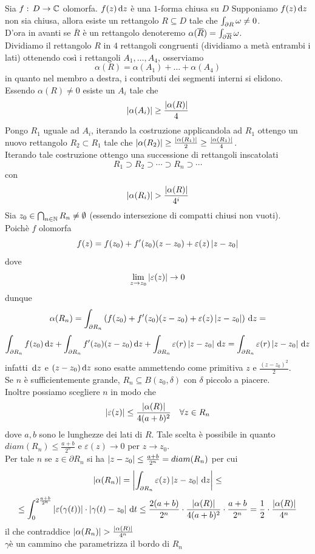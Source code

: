 \newpage
\begin{thm}Sia $f:\, D \to \mathbb{C}$ olomorfa. $f(z)\, \mathrm{d} z $ \`e una $1$-forma chiusa su $D$ 
\proof Supponiamo $f(z) \, \mathrm{d} z $ non sia chiusa, allora esiste un rettangolo $R\subseteq D$ tale che $\int_{\partial R} \omega \neq 0$.\\
D'ora in avanti se $\overline{R}$ \`e un rettangolo denoteremo $\alpha(\overline{R})=\int_{\partial \overline{R}} \omega$.\\
Dividiamo il rettangolo $R$ in $4$ rettangoli congruenti (dividiamo a met\`a entrambi i lati) ottenendo cos\`i i rettangoli $A_1, \dots, A_4$, osserviamo 
$$ \alpha(R) =\alpha(A_1) +\dots + \alpha(A_4)$$
in quanto nel membro a destra, i contributi dei segmenti interni si elidono.\\
Essendo $\alpha(R)\neq 0$ esiste un $A_i$ tale che 
$$ \left\vert \alpha(A_i) \right\vert\geq \frac{\left\vert \alpha(R) \right\vert}{4}$$ 
Pongo $R_1$ uguale ad $A_i$, iterando la costruzione applicandola ad $R_1$ ottengo un nuovo rettangolo $R_2\subset R_1$ tale che $\left\vert \alpha(R_2) \right\vert\geq \frac{\left\vert \alpha(R_1) \right\vert}{2}\geq \frac{\left\vert \alpha(R_1) \right\vert}{4}$.\\
Iterando tale costruzione ottengo una successione di rettangoli inscatolati $$R_1 \supset R_2 \supset \cdots \supset R_n \supset\cdots$$
con 
$$ \left\vert \alpha(R_i) \right\vert> \frac{\left\vert \alpha(R) \right\vert}{4^i}$$
Sia $z_0\in \bigcap_{n\in \mathbb{N}} R_n\neq \emptyset$ (essendo intersezione di compatti chiusi non vuoti).\\
Poich\`e $f$ olomorfa 
$$ f(z) = f(z_0) + f'(z_0) (z-z_0) + \varepsilon (z) \left\vert z-z_0 \right\vert$$
dove 
$$ \lim_{z\to z_0} \left\vert \varepsilon(z) \right\vert \to 0 $$ 
dunque 
$$ \alpha(R_n) =\int_{\partial R_n} \left( f(z_0) +f'(z_0) (z-z_0) +\varepsilon(z) \left\vert z-z_0 \right\vert \right) \, \mathrm{d} z =$$
$$\int_{\partial R_n} f(z_0)\, \mathrm{d} z   + \int_{\partial R_n} f'(z_0) (z-z_0) \, \mathrm{d} z +\int_{\partial R_n} \varepsilon(r) \left\vert z-z_0 \right\vert \, \mathrm{d} z 
= \int_{\partial R_n} \varepsilon(r) \left\vert z-z_0 \right\vert \, \mathrm{d} z $$
infatti $\, \mathrm{d} z $ e $(z-z_0)\, \mathrm{d} z $ sono esatte ammettendo come primitiva $z$ e $\frac{(z-z_0)^2}{2}$.\\
Se $n$ \`e sufficientemente grande, $R_n\subseteq B(z_0, \delta)$ con $\delta$ piccolo a piacere.\\
Inoltre possiamo scegliere $n$ in modo che 
$$ \left\vert \varepsilon(z)  \right\vert \leq \frac{\left\vert \alpha(R) \right\vert}{4(a+b)^2} \quad \forall z\in R_n$$
dove $a,b$ sono le lunghezze dei lati di $R$. Tale scelta \`e possibile in quanto $diam(R_n) \leq \frac{a+b}{2^n}$ e $\varepsilon(z) \to 0 $ per $z\to z_0$.\\
Per tale $n$ se $z\in \partial R_n$  si ha $\left\vert z-z_0 \right\vert \leq \frac{a+b}{2^n}=diam(R_n)$ per cui 
$$ \left\vert \alpha(R_n) \right\vert = \left\vert \int_{\partial R_n } \varepsilon(z) \left\vert z-z_0 \right\vert \, \mathrm{d} z  \right\vert \leq 
$$$$\leq \int_{0}^{2\frac{a+b}{2^n}} 
\left\vert \varepsilon(\gamma(t)) \right\vert \cdot \left\vert \gamma(t) - z_0 \right\vert \, \mathrm{d}t \leq \frac{2(a+b)}{2^n} \cdot \frac{\left\vert \alpha(R) \right\vert}{4(a+b)^2}\cdot \frac{a+b}{2^n} =\frac{1}{2}\cdot \frac{\left\vert \alpha(R) \right\vert}{4^n}$$
il che contraddice $\left\vert \alpha(R_n) \right\vert > \frac{\left\vert \alpha(R) \right\vert}{4^n}$\\
$\gamma $\`e un cammino che parametrizza il bordo di $R_n$
\endproof
\end{thm}

